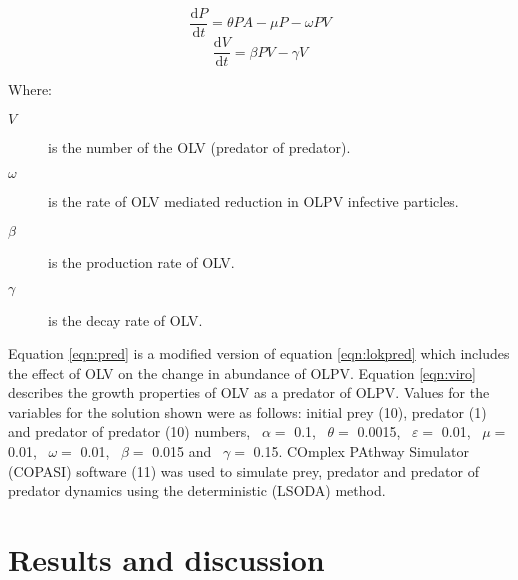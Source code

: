 \begin{equation}
\frac{\mathrm{d}P}{\mathrm{d}t}= \theta PA - \mu P - \omega PV
\label{eqn:pred}
\end{equation}
\begin{equation}
\frac{\mathrm{d}V}{\mathrm{d}t}=\beta PV - \gamma V
\label{eqn:viro}
\end{equation}

Where:
\begin{description}
\item[$V$] is the number of the \ac{OLV} (predator of predator).
\item[$\omega$] is the rate of \ac{OLV} mediated reduction in OLPV infective particles.
\item[$\beta$] is the production rate of \ac{OLV}.
\item[$\gamma$] is the decay rate of \ac{OLV}.
\end{description}

Equation \ref{eqn:pred} is a modified version of equation \ref{eqn:lokpred} which includes the effect of \ac{OLV} on the change in abundance of \ac{OLPV}.
Equation \ref{eqn:viro} describes the growth properties of \ac{OLV} as a predator of \ac{OLPV}.
Values for the variables for the solution shown  were as follows: initial prey (10), predator (1) and predator of predator (10) numbers, ~$\alpha=$ 0.1, ~$\theta=$ 0.0015, ~$\varepsilon=$ 0.01, ~$\mu=$ 0.01, ~$\omega=$ 0.01, ~$\beta=$ 0.015 and ~$\gamma=$ 0.15. 
COmplex PAthway Simulator (\textsc{COPASI}) software (11) was used to simulate prey, predator and predator of predator dynamics using the deterministic (\textsc{LSODA}) method.


\section{Results and discussion}
\acresetall
